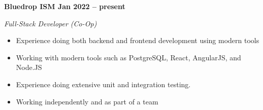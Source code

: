 \vspace{0.1cm}
\textbf{Bluedrop ISM \hfill Jan 2022 -- present} \par
\textit{Full-Stack Developer (Co-Op)} \par
\begin{itemize}
	\item Experience doing both backend and frontend development using modern tools
    \item Working with modern tools such as PostgreSQL, React, AngularJS, and Node.JS
    \item Experience doing extensive unit and integration testing.
    \item Working independently and as part of a team
\end{itemize} \par